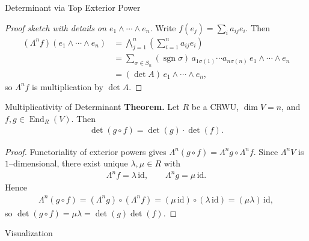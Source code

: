 \begin{frame}{Determinant via Top Exterior Power}
\begin{proof}[Proof sketch with details on $e_1\wedge\!\cdots\!\wedge e_n$]
Write $f(e_j)=\sum_{i}a_{ij}e_i$. Then
\begin{align*}
(\Lambda^n f)(e_1\wedge\cdots\wedge e_n)
&=\bigwedge_{j=1}^n\left(\sum_{i=1}^n a_{ij}e_i\right)\\
&
= \sum_{\sigma\in S_n}\!\left(\operatorname{sgn}\sigma\right)\, a_{1\sigma(1)}\cdots a_{n\sigma(n)} \, e_1\wedge\cdots\wedge e_n\\
&=(\det A)\, e_1\wedge\cdots\wedge e_n,
\end{align*}
so $\Lambda^n f$ is multiplication by $\det A$.
\end{proof}
\end{frame}

\begin{frame}{Multiplicativity of Determinant}
\textbf{Theorem.}
Let $R$ be a CRWU, $\dim V=n$, and $f,g\in\operatorname{End}_R(V)$. Then
\begin{align*}
\det(g\circ f)=\det(g)\cdot \det(f).
\end{align*}
\vspace{-0.6cm}
\begin{proof}
Functoriality of exterior powers gives $\Lambda^{n}(g\circ f)=\Lambda^{n}g\circ \Lambda^{n}f$. Since $\Lambda^{n}V$ is $1$–dimensional, there exist unique $\lambda,\mu\in R$ with
\begin{align*}
\Lambda^{n}f=\lambda\,\mathrm{id},\qquad \Lambda^{n}g=\mu\,\mathrm{id}.
\end{align*}
Hence
\begin{align*}
\Lambda^{n}(g\circ f)=(\Lambda^{n}g)\circ(\Lambda^{n}f)=(\mu\,\mathrm{id})\circ(\lambda\,\mathrm{id})=(\mu\lambda)\,\mathrm{id},
\end{align*}
so $\det(g\circ f)=\mu\lambda=\det(g)\det(f)$.
\end{proof}
\end{frame}

\begin{frame}{Visualization}
    \begin{center}
\end{center}
\end{frame}

